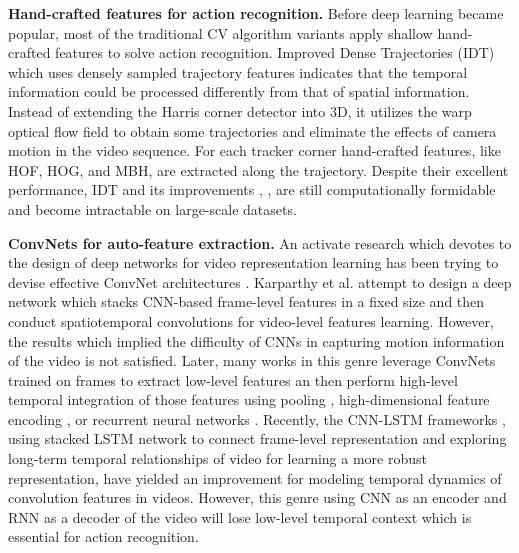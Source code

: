 \documentclass[conference,compsoc]{IEEEtran}
\begin{document}
\noindent\textbf{Hand-crafted features for action recognition.} Before deep learning became popular, most of the traditional CV algorithm variants apply shallow hand-crafted features to solve action recognition. Improved Dense Trajectories (IDT) \cite{wang2013action} which uses densely sampled trajectory features indicates that the temporal information could be processed differently from that of spatial information. Instead of extending the Harris corner detector into 3D, it utilizes the warp optical flow field to obtain some trajectories and eliminate the effects of camera motion in the video sequence. For each tracker corner hand-crafted features, like HOF, HOG, and MBH, are extracted along the trajectory. Despite their excellent performance, IDT and its improvements \cite{peng2016bag}, \cite{pan2016fast}, \cite{wang2015action} are still computationally formidable and become intractable on large-scale datasets.

\noindent\textbf{ConvNets for auto-feature extraction.} An activate research which devotes to the design of deep networks for video representation learning has been trying to devise effective ConvNet architectures \cite{karpathy2014large} \cite{varol2018long} \cite{tran2017convnet} \cite{varol2018long} \cite{donahue2015long}. Karparthy et al. \cite{karpathy2014large} attempt to design a deep network which stacks CNN-based frame-level features in a fixed size and then conduct spatiotemporal convolutions for video-level features learning. However, the results which implied the difficulty of CNNs in capturing motion information of the video is not satisfied. Later, many works in this genre leverage ConvNets trained on frames to extract low-level features an then perform high-level temporal integration of those features using pooling \cite{wang2018video} \cite{wang2018learning}, high-dimensional feature encoding \cite{Girdhar2017ActionVLAD} \cite{diba2017deep}, or recurrent neural networks \cite{donahue2015long} \cite{wu2015modeling} \cite{varol2018long} \cite{yue2015beyond}. Recently, the CNN-LSTM frameworks \cite{donahue2015long} \cite{wu2015modeling}, using stacked LSTM network to connect frame-level representation and exploring long-term temporal relationships of video for learning a more robust representation,  have yielded an improvement for modeling temporal dynamics of convolution features in videos. However, this genre using CNN as an encoder and RNN as a decoder of the video will lose low-level temporal context which is essential for action recognition.
\end{document}
